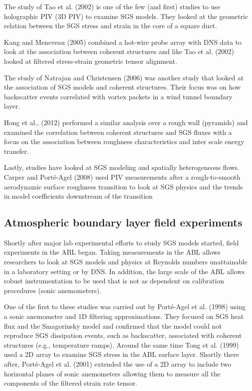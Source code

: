 \documentclass[11pt]{article}
\begin{document}
The study of Tao et al. (2002) is one of the few (and first) studies to use holographic PIV (3D PIV) to examine SGS models.  They looked at the geometric relation between the SGS stress and strain in the core of a square duct. 

Kang and Meneveau (2005) combined a hot-wire probe array with DNS data to look at the association between coherent structures and like Tao et al. (2002) looked at filtered stress-strain geometric tensor alignment. 

The study of Natrajan and Christensen (2006) was another study that looked at the association of SGS models and coherent structures.  Their focus was on how backscatter events correlated with vortex packets in a wind tunnel boundary layer.  

Hong et al., (2012) performed a similar analysis over a rough wall (pyramids) and examined the correlation between coherent structures and SGS fluxes with a focus on the association between roughness characteristics and inter scale energy transfer. 

Lastly, studies have looked at SGS modeling and spatially heterogeneous flows.  Carper and Port\'e-Agel (2008) used PIV measurements after a rough-to-smooth aerodynamic surface roughness transition to look at SGS physics and the trends in model coefficients downstream of the transition

\subsection*{Atmospheric boundary layer field experiments}

Shortly after major lab experimental efforts to study SGS models started, field experiments in the ABL began.  Taking measurements in the ABL allows researchers to look at SGS models and physics at Reynolds numbers unattainable in a laboratory setting or by DNS.  In addition, the large scale of the ABL allows robust instrumentation to be used that is not as dependent on calibration procedures (sonic anemometers).  

One of the first to these studies was carried out by Port\'e-Agel et al. (1998) using a sonic anemometer and 1D filtering approximations. They focused on SGS heat flux and the Smagorinsky model and confirmed that the model could not reproduce SGS dissipation events, such as backscatter, associated with coherent structures (e.g., temperature ramps).  Around the same time Tong et al. (1999) used a 2D array to examine SGS stress in the ABL surface layer. Shortly there after, Port\'e-Agel et al. (2001) extended the use of a 2D array to include two horizontal planes of sonic anemometers allowing them to measure all the components of the filtered strain rate tensor.  
\end{document}
